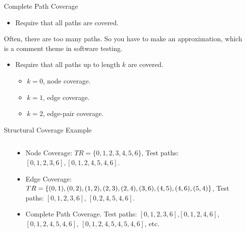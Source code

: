 \documentclass[handout]{beamer}
\begin{document}
\begin{frame}{Complete Path Coverage}
  \begin{itemize}
  \item Require that all paths are covered.
  \end{itemize}
  Often, there are too many paths. So you have to make an
  approximation, which is a comment theme in software testing.
  \begin{itemize}
  \item Require that all paths up to length $k$ are covered.
    \begin{itemize}
    \item $k=0$, node coverage.
    \item $k=1$, edge coverage.
    \item $k=2$, edge-pair coverage.
    \end{itemize}
  \end{itemize}
\end{frame}

 \begin{frame}{Structural Coverage Example}
  \begin{columns}
    \begin{column}{0.2\textwidth}
    \end{column}
    \begin{column}{0.8\textwidth}
      \begin{itemize}
      \item Node Coverage: $TR=\{0,1,2,3,4,5,6\}$, Test paths:
        $[0,1,2,3,6],[0,1,2,4,5,4,6]$.
      \item Edge Coverage:
        $TR=\{(0,1),(0,2),(1,2),(2,3),(2,4),(3,6),(4,5),(4,6), \newline (5,4)\}$,
        Test paths: $[0,1,2,3,6]$, $[0,2,4,5,4,6]$.
      \item Complete Path Coverage. Test paths:
        $[0,1,2,3,6]$,$[0,1,2,4,6]$,$[0,1,2,4,5,4,6]$,
        $[0,1,2,4,5,4,5,4,6]$, etc.
      \end{itemize}
    \end{column}
  \end{columns}
\end{frame}
\end{document}
